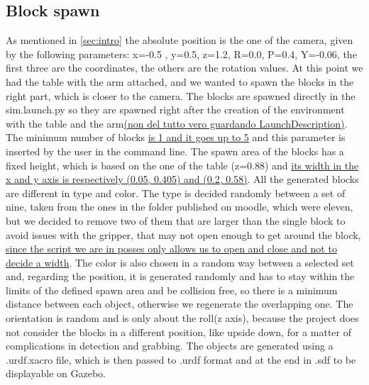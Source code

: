 \documentclass[12pt,a4paper]{article}
\begin{document}
\subsection{Block spawn}\label{subsec:blockspawn}
As mentioned in \ref{sec:intro} the absolute position is the one of the camera, given by the following parameters: x=-0.5 , y=0.5, z=1.2, R=0.0, P=0.4, Y=-0.06, the first three are the coordinates, the others are the rotation values. At this point we had the table with the arm attached, and we wanted to spawn the blocks in the right part, which is closer to the camera. The blocks are spawned directly in the sim.launch.py so they are spawned right after the creation of the environment with the table and the arm\uline{(non del tutto vero guardando LaunchDescription)}. The minimum number of blocks \uline{is 1 and it goes up to 5} and this parameter is inserted by the user in the command line. The spawn area of the blocks has a fixed height, which is based on the one of the table (z=0.88) and \uline{its width in the x and y axis is respectively (0.05, 0.405) and (0.2, 0.58)}. All the generated blocks are different in type and color. The type is decided randomly between a set of nine, taken from the ones in the folder published on moodle, which were eleven, but we decided to remove two of them that are larger than the single block to avoid issues with the gripper, that may not open enough to get around the block, \uline{since the script we are in posses only allows us to open and close and not to decide a width}. The color is also chosen in a random way between a selected set and, regarding the position, it is generated randomly and has to stay within the limits of the defined spawn area and be collision free, so there is a minimum distance between each object, otherwise we regenerate the overlapping one. The orientation is random and is only about the roll(z axis), because the project does not consider the blocks in a different position, like upside down, for a matter of complications in detection and grabbing.
The objects are generated using a .urdf.xacro file, which is then passed to .urdf format and at the end in .sdf to be displayable on Gazebo. 
\end{document}
